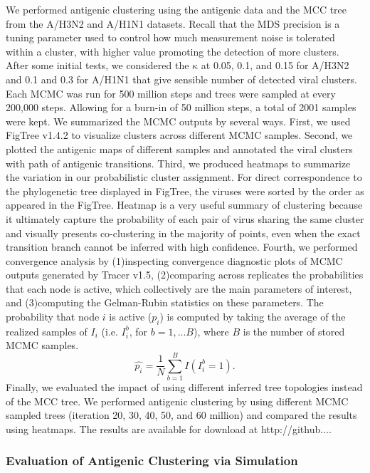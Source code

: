 \documentclass[11pt,oneside,letterpaper]{article}
\begin{document}
	
We performed antigenic clustering using the antigenic data and the MCC tree from the A/H3N2 and A/H1N1 datasets. 
Recall that the MDS precision is a tuning parameter used to control how much measurement noise is tolerated within a cluster, with higher value promoting the detection of more clusters. 
After some initial tests, we considered the $\kappa$ at 0.05, 0.1, and 0.15 for A/H3N2 and 0.1 and 0.3 for A/H1N1 that give sensible number of detected viral clusters.  
Each MCMC was run for 500 million steps and trees were sampled at every 200,000 steps. 
Allowing for a burn-in of 50 million steps, a total of 2001 samples were kept.
We summarized the MCMC outputs by several ways. 
First, we used FigTree v1.4.2 to visualize clusters across different  MCMC samples. 
Second, we plotted the antigenic maps of different samples and annotated the viral clusters with path of antigenic transitions. 
Third, we produced heatmaps to summarize the variation in our probabilistic cluster assignment. 
For direct correspondence to the phylogenetic tree displayed in FigTree, the viruses were sorted by the order as appeared in the FigTree.
Heatmap is a very useful summary of clustering because it ultimately capture the probability of each pair of virus sharing the same cluster and visually presents co-clustering in the majority of points, even when the exact transition branch cannot be inferred with high confidence. %
Fourth, we performed convergence analysis by (1)inspecting convergence diagnostic plots of MCMC outputs generated by Tracer v1.5, (2)comparing across replicates the probabilities that each node is active, which collectively are the main parameters of interest, and (3)computing the Gelman-Rubin statistics on these parameters. 
The probability that node $i$ is active ($p_i$) is computed by taking the average of the realized samples of $I_i$ (i.e. $I_i^b$, for $b=1,...B$), where $B$ is the number of stored MCMC samples.
\begin{equation}
 \hat{p_i} = \frac{1}{N} \sum_{b=1}^{B} I(I_i^b  = 1).
\end{equation}
Finally, we evaluated the impact of using different inferred tree topologies instead of the MCC tree. 
We performed antigenic clustering by using different MCMC sampled trees (iteration 20, 30, 40, 50, and 60 million) and compared the results using heatmaps.
The results are available for download at http://github....


\subsubsection*{Evaluation of Antigenic Clustering via Simulation}
\end{document}
